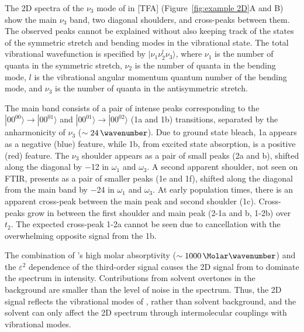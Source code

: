 {The 2D spectra of the \(\nu_3\) mode of  in \ce{[Im_{4,1}]}[TFA] (Figure~\ref{fig:example 2D}A and B) show the main \(\nu_3\) band, two diagonal shoulders, and cross-peaks between them. The observed peaks cannot be explained without also keeping track of the states of the  symmetric stretch and bending modes in the vibrational state. The total vibrational wavefunction is specified by $|\nu_1 \nu_2^l \nu_3 \rangle$, where \(\nu_1\) is the number of quanta in the symmetric stretch, \(\nu_2\) is the number of quanta in the bending mode, $l$ is the vibrational angular momentum quantum number of the bending mode, and \(\nu_3\) is the number of quanta in the antisymmetric stretch.

The main band consists of a pair of intense peaks corresponding to the $|00^00\rangle\rightarrow|00^01\rangle$  and $|00^01\rangle\rightarrow|00^02\rangle$ (1a and 1b) transitions, separated by the anharmonicity of \(\nu_3\) (\(\sim \SI{24}{\wavenumber}\)). Due to ground state bleach, 1a appears as a negative (blue) feature, while 1b, from excited state absorption, is a positive (red) feature. The \(\nu_3\) shoulder appears as a pair of small peaks (2a and b), shifted along the diagonal by \SI{-12}{\wavenumber} in \(\omega_1\) and \(\omega_3\). A second apparent shoulder, not seen on FTIR, presents as a pair of smaller peaks (1e and 1f), shifted along the diagonal from the main band by \SI{-24}{\wavenumber} in \(\omega_1\) and \(\omega_3\). At early population times, there is an apparent cross-peak between the main peak and second shoulder (1c). Cross-peaks grow in between the first shoulder and main peak (2-1a and b, 1-2b) over \(t_2\). The expected cross-peak 1-2a cannot be seen due to cancellation with the overwhelming opposite signal from the 1b.

The combination of 's high molar absorptivity (\(\sim \SI{1000}{\per\Molar\wavenumber}\)) and the \(\varepsilon^2\) dependence of the third-order signal causes the 2D signal from  to dominate the spectrum in intensity. Contributions from solvent overtones in the background are smaller than the level of noise in the spectrum. Thus, the 2D signal reflects the vibrational modes of , rather than solvent background, and the solvent can only affect the 2D spectrum through intermolecular couplings with  vibrational modes.

}
